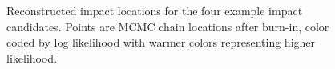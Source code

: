 \documentclass[a4paper]{jpconf}
\begin{document}
\begin{figure}[h!]
	\centering
	\quad
	\\	
        \quad
	\\	
	\caption{Reconstructed impact locations for the four example impact candidates. Points are MCMC chain locations after burn-in, color coded by log likelihood with warmer colors representing higher likelihood.}
\end{figure}
\FloatBarrier
\end{document}
